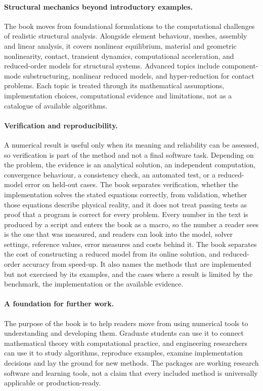 \paragraph{Structural mechanics beyond introductory examples.} The book moves from foundational formulations to the computational challenges of realistic structural analysis. Alongside element behaviour, meshes, assembly and linear analysis, it covers nonlinear equilibrium, material and geometric nonlinearity, contact, transient dynamics, computational acceleration, and reduced-order models for structural systems. Advanced topics include component-mode substructuring, nonlinear reduced models, and hyper-reduction for contact problems. Each topic is treated through its mathematical assumptions, implementation choices, computational evidence and limitations, not as a catalogue of available algorithms.

\paragraph{Verification and reproducibility.} A numerical result is useful only when its meaning and reliability can be assessed, so verification is part of the method and not a final software task. Depending on the problem, the evidence is an analytical solution, an independent computation, convergence behaviour, a consistency check, an automated test, or a reduced-model error on held-out cases. The book separates verification, whether the implementation solves the stated equations correctly, from validation, whether those equations describe physical reality, and it does not treat passing tests as proof that a program is correct for every problem. Every number in the text is produced by a script and enters the book as a macro, so the number a reader sees is the one that was measured, and readers can look into the model, solver settings, reference values, error measures and costs behind it. The book separates the cost of constructing a reduced model from its online solution, and reduced-order accuracy from speed-up. It also names the methods that are implemented but not exercised by its examples, and the cases where a result is limited by the benchmark, the implementation or the available evidence.

\paragraph{A foundation for further work.} The purpose of the book is to help readers move from using numerical tools to understanding and developing them. Graduate students can use it to connect mathematical theory with computational practice, and engineering researchers can use it to study algorithms, reproduce examples, examine implementation decisions and lay the ground for new methods. The packages are working research software and learning tools, not a claim that every included method is universally applicable or production-ready.
